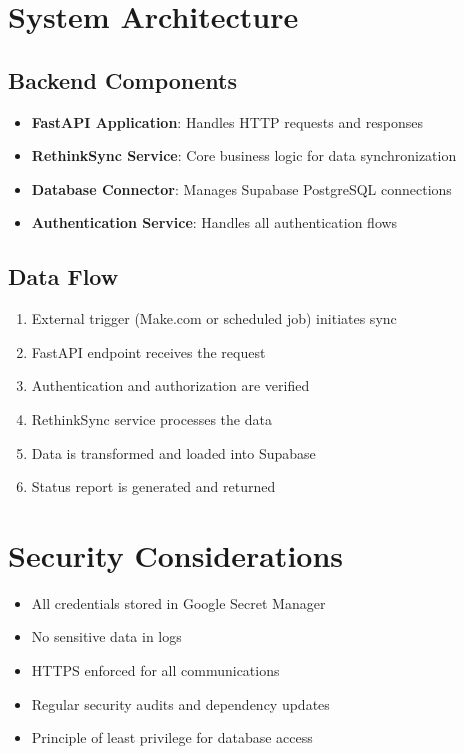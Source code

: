 \documentclass[11pt,a4paper]{article}
\begin{document}
\section{System Architecture}
\subsection{Backend Components}
\begin{itemize}
    \item \textbf{FastAPI Application}: Handles HTTP requests and responses
    \item \textbf{RethinkSync Service}: Core business logic for data synchronization
    \item \textbf{Database Connector}: Manages Supabase PostgreSQL connections
    \item \textbf{Authentication Service}: Handles all authentication flows
\end{itemize}

\subsection{Data Flow}
\begin{enumerate}
    \item External trigger (Make.com or scheduled job) initiates sync
    \item FastAPI endpoint receives the request
    \item Authentication and authorization are verified
    \item RethinkSync service processes the data
    \item Data is transformed and loaded into Supabase
    \item Status report is generated and returned
\end{enumerate}

\section{Security Considerations}
\begin{itemize}
    \item All credentials stored in Google Secret Manager
    \item No sensitive data in logs
    \item HTTPS enforced for all communications
    \item Regular security audits and dependency updates
    \item Principle of least privilege for database access
\end{itemize}
\end{document}
